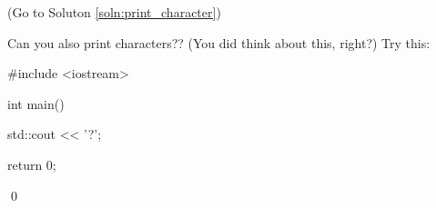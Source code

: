 (Go to Soluton \ref{soln:print_character})

Can you also print characters?? (You did think about this, right?) Try this:

\begin{console}

#include <iostream>



int main()

{

    std::cout << '?';



    return 0;

}

\end{console}

\qed

